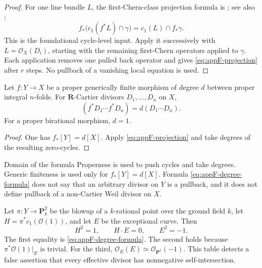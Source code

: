 \begin{proof}
For one line bundle \(L\), the first-Chern-class projection formula is
\cite[Proposition~2.3(c)]{Ful}; see also
\cite[Tag~02SU]{StacksProject}:
\[
 f_*\bigl(c_1(f^*L)\cap\gamma\bigr)
 =c_1(L)\cap f_*\gamma.
\]
This is the foundational cycle-level input.  Apply it successively with
\(L=\mathcal O_X(D_i)\), starting with the remaining first-Chern
operators applied to \(\gamma\).  Each application removes one pulled
back operator and gives \eqref{eq:appF-projection} after \(r\) steps.
No pullback of a vanishing local equation is used.
\end{proof}

\begin{corollary}\label{cor:appF-generically-finite}
Let \(f:Y\to X\) be a proper generically finite morphism of degree \(d\)
between proper integral \(n\)-folds.
For \(\mathbf R\)-Cartier divisors \(D_1,\ldots,D_n\) on \(X\),
\[
                   (f^*D_1\cdots f^*D_n)
                   =d(D_1\cdots D_n).
\tag{F.4}\label{eq:appF-degree-formula}
\]
For a proper birational morphism, \(d=1\).
\end{corollary}

\begin{proof}
One has \(f_*[Y]=d[X]\).
Apply \eqref{eq:appF-projection} and take degrees of the resulting
zero-cycles.
\end{proof}

\begin{warning}{Domain of the formula}
\label{warn:appF-projection-domain}
Properness is used to push cycles and take degrees.
Generic finiteness is used only for \(f_*[Y]=d[X]\).
Formula \eqref{eq:appF-degree-formula} does not say that an arbitrary
divisor on \(Y\) is a pullback, and it does not define pullback of a
non-Cartier Weil divisor on \(X\).
\end{warning}

\begin{example}
\label{ex:appF-blowup}
Let \(\pi:Y\to\mathbf P^2_k\) be the blowup of a \(k\)-rational point
over the ground field \(k\), let
\(H=\pi^*c_1(\mathcal O(1))\), and let \(E\) be the exceptional curve.
Then
\[
                         H^2=1,\qquad H\cdot E=0,\qquad E^2=-1.
\tag{F.5}\label{eq:appF-blowup-table}
\]
The first equality is \eqref{eq:appF-degree-formula}.
The second holds because \(\pi^*\mathcal O(1)|_E\) is trivial.
For the third, \(\mathcal O_E(E)\simeq\mathcal O_{\mathbf P^1}(-1)\).
This table detects a false assertion that every effective divisor has
nonnegative self-intersection.
\end{example}

